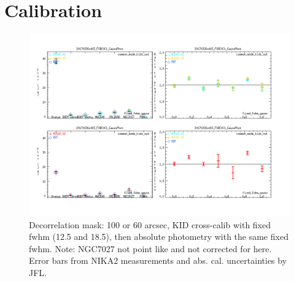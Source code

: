 \documentclass[a4paper, 11pt]{article} %
\begin{document}
\section{Calibration}
\label{se:calibration}


\label{se:cal_HA}


\label{se:ref_flux}


\label{se:cal_JFL}

\begin{figure}
\begin{center}
\includegraphics[clip, angle=0, scale = 0.4]{Figures/Calibrators_N2R9_20170226s415_FXDC0C1_GaussPhotFluxType_fixed_fwhm_gauss.png}
\caption{Decorrelation mask: 100 or 60 arcsec, KID cross-calib with fixed fwhm
  (12.5 and 18.5), then absolute photometry with the same fixed fwhm. Note:
  NGC7027 not point like and not corrected for here. Error bars from NIKA2
  measurements and abs. cal. uncertainties by JFL.}
\label{fig:fov}
\end{center}
\end{figure}






\clearpage
\end{document}
